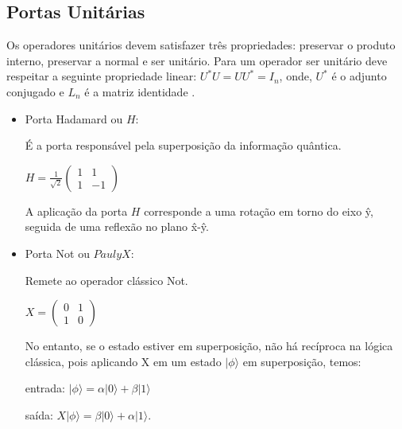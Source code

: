 \documentclass[tcc,capa]{texufpel}
\begin{document}
\subsection{Portas Unitárias}
Os operadores unitários devem satisfazer três propriedades: preservar o produto
interno, preservar a normal e ser unitário. Para um operador ser unitário deve respeitar a seguinte propriedade linear: $U^*U=U U^*= I_n$, onde, $U^*$ é o adjunto conjugado e $L_n$ é a matriz identidade \cite{chuang00a}.

\begin{itemize}

   
  \item \begin{center}Porta Hadamard ou $H$: \cite{chuang00a}
  \end{center}  
  
    É a porta responsável pela superposição da informação quântica.
    
   
      \begin{center}  $ H = \frac{1}{\sqrt{2}}\left( \begin{array}{cc}
            1 & 1  \\
            1 & -1
        \end{array}\right)  $
  \end{center}
  
   A aplicação da porta $H$ corresponde a uma rotação em torno do eixo \^{y}, seguida de uma reflexão no plano \^{x}-\^{y}. 
   
    \item \begin{center} 
    Porta Not ou $Pauly X$:\cite{chuang00a}
    \end{center}
    Remete ao operador clássico Not.
    
    \begin{center} 
    $X= \left( \begin{array}{cc}
        0 & 1 \\
        1 & 0
    \end{array}
    \right) $
    \end{center}
    No entanto, se o estado estiver em superposição, não há recíproca na lógica clássica, pois aplicando X em um estado $|\phi\rangle$ em superposição, temos:
    
   \begin{center} 
   
    entrada: $|\phi\rangle= \alpha|0\rangle + \beta|1\rangle$
    
    saída: $X|\phi\rangle= \beta|0\rangle + \alpha|1\rangle$.
    \end{center}
    

\end{itemize}
\end{document}
